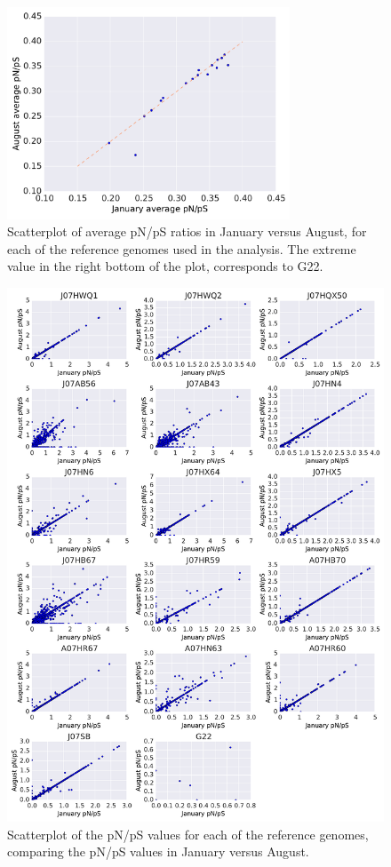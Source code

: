 \begin{figure}[]
  \centering
  \includegraphics[width=0.75\textwidth,height=\textheight,keepaspectratio]{Chapter5/Figures/Scatter_Genomes_pNpS.pdf}
  \caption{Scatterplot of average pN/pS ratios in January versus August, for each of the reference genomes used in the analysis. The extreme value in the right bottom of the plot, corresponds to G22.}
  \label{Genome_comp_pNpS}
\end{figure}


\begin{figure}[]
  \centering
  \includegraphics[width=\textwidth,height=0.8\textheight,keepaspectratio]{Chapter5/Figures/Gene_pN_pS.pdf}
  \caption{Scatterplot of the pN/pS values for each of the reference genomes, comparing the pN/pS values in January versus August.}
  \label{Gene_pN_pS}
\end{figure}

